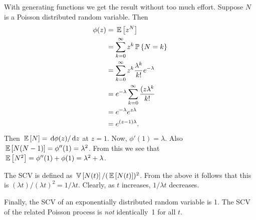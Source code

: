 \begin{question}
\begin{solution}
With generating functions we get the result without too much
effort. Suppose $N$ is a Poisson distributed random variable. Then 
\begin{equation*}
  \begin{split}
\phi(z)
&=  \,\mathbb{E}\left[z^N\right] \\
&= \sum_{k=0}^\infty z^k \,\mathbb{P}\left\{N=k\right\} \\
&= \sum_{k=0}^\infty z^k \frac{\lambda^k}{k!} e^{-\lambda}  \\
&= e^{-\lambda} \sum_{k=0}^\infty  \frac{(z\lambda^k}{k!}  \\
&= e^{-\lambda} e^{z \lambda} \\
&= e^{(z-1)\lambda}.
  \end{split}
\end{equation*}
Then $\,\mathbb{E}\left[N\right] = \,\text{d}\phi(z)/\,\text{d}z$ at $z=1$. Now, $\phi'(1) = \lambda$. Also $\,\mathbb{E}\left[N(N-1)\right]= \phi''(1) = \lambda^2$. From this we see that $\,\mathbb{E}\left[N^2\right] = \phi''(1) + \phi(1) = \lambda^2 + \lambda$. 

The SCV is defined as $\,\mathbb{V}\left[N(t)\right]/(\,\mathbb{E}\left[N(t)\right])^2$. From the above it
follows that this is $(\lambda t)/(\lambda t)^2 = 1/\lambda t$.
Clearly, as $t$
increases, $1/\lambda t$ decreases.



Finally, the SCV of an exponentially distributed random variable is
1. The SCV of the related Poisson process is \emph{not} identically~1
for all $t$.

\end{solution}
\end{question}



